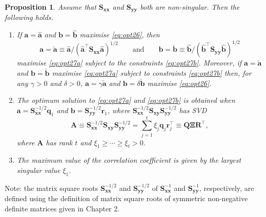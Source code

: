 \documentclass[]{book}
\newtheorem{proposition}{Proposition}[chapter]
\theoremstyle{definition}
\theoremstyle{definition}
\theoremstyle{definition}
\theoremstyle{remark}
\begin{document}
\begin{proposition}
\protect\hypertarget{prp:unnamed-chunk-1}{}{\label{prp:unnamed-chunk-1} }Assume that \(\boldsymbol S_{\boldsymbol x\boldsymbol x}\) and \(\boldsymbol S_{\boldsymbol y\boldsymbol y}\) both are non-singular. Then the following holds.

\begin{enumerate}
\def\labelenumi{\arabic{enumi}.}
\item
  If \(\boldsymbol a=\hat{\boldsymbol a}\) and \(\boldsymbol b=\hat{\boldsymbol b}\) maximise \eqref{eq:opt26}, then
  \[
  \boldsymbol a=\check{\boldsymbol a}\equiv\hat{\boldsymbol a}/(\hat{\boldsymbol a}^\top \boldsymbol S_{\boldsymbol x\boldsymbol x}\hat{\boldsymbol a})^{1/2} \qquad \text{and} \qquad
  \boldsymbol b=\check{\boldsymbol b}\equiv \hat{\boldsymbol b}/(\hat{\boldsymbol b}^\top \boldsymbol S_{\boldsymbol y\boldsymbol y}\hat{\boldsymbol b})^{1/2}
  \]
  maximise \eqref{eq:opt27a} subject to the constraints \eqref{eq:opt27b}. Moreover, if \(\boldsymbol a=\check{\boldsymbol a}\) and \(\boldsymbol b=\check{\boldsymbol b}\) maximise \eqref{eq:opt27a} subject to constraints
  \eqref{eq:opt27b} then, for any \(\gamma>0\) and \(\delta>0\), \(\boldsymbol a=\gamma \check{\boldsymbol a}\) and \(\boldsymbol b=\delta \check{\boldsymbol b}\) maximise \eqref{eq:opt26}.
\item
  The optimum solution to \eqref{eq:opt27a} and \eqref{eq:opt27b} is obtained when \(\boldsymbol a=\boldsymbol S_{\boldsymbol x\boldsymbol x}^{-1/2}{\mathbf q}_1\) and \(\boldsymbol b=\boldsymbol S_{\boldsymbol y\boldsymbol y}^{-1/2} {\mathbf r}_1\), where \(\boldsymbol S_{\boldsymbol x\boldsymbol x}^{-1/2} \boldsymbol S_{\boldsymbol x\boldsymbol y}\boldsymbol S_{\boldsymbol y\boldsymbol y}^{-1/2}\) has SVD
  \begin{equation}
  \boldsymbol A\equiv \boldsymbol S_{\boldsymbol x\boldsymbol x}^{-1/2}\boldsymbol S_{\boldsymbol x\boldsymbol y}\boldsymbol S_{\boldsymbol y\boldsymbol y}^{-1/2}= \sum_{j=1}^t \xi_j {\mathbf q}_j {\mathbf r}_j^\top \equiv {\mathbf Q}{\pmb \Xi} {\mathbf R}^\top,
  \label{eq:svdcca}
  \end{equation}
  where \(\boldsymbol A\) has rank \(t\) and \(\xi_1 \geq \cdots \geq \xi_t >0\).
\item
  The maximum value of the correlation coefficient is given by the largest singular value \(\xi_1\).
\end{enumerate}
\end{proposition}

Note: the matrix square roots \(\boldsymbol S_{\boldsymbol x\boldsymbol x}^{-1/2}\) and \(\boldsymbol S_{\boldsymbol y\boldsymbol y}^{-1/2}\) of \(\boldsymbol S_{\boldsymbol x\boldsymbol x}^{-1}\) and \(\boldsymbol S_{\boldsymbol y\boldsymbol y}^{-1}\), respectively, are defined using the definition of matrix square roots of symmetric non-negative definite matrices given in Chapter 2.
\end{document}
